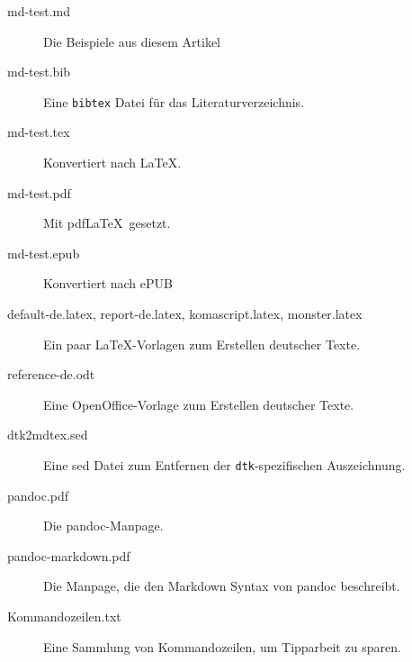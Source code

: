 \documentclass[11pt,ngerman,a4paper]{article}
\begin{document}
\begin{description}
\item[md-test.md]
Die Beispiele aus diesem Artikel
\item[md-test.bib]
Eine \texttt{bibtex} Datei für das Literaturverzeichnis.
\item[md-test.tex]
Konvertiert nach LaTeX.
\item[md-test.pdf]
Mit pdfLaTeX~gesetzt.
\item[md-test.epub]
Konvertiert nach ePUB
\item[default-de.latex, report-de.latex, komascript.latex,
monster.latex]
Ein paar LaTeX-Vorlagen zum Erstellen deutscher Texte.
\item[reference-de.odt]
Eine OpenOffice-Vorlage zum Erstellen deutscher Texte.
\item[dtk2mdtex.sed]
Eine sed Datei zum Entfernen der \texttt{dtk}-spezifischen Auszeichnung.
\item[pandoc.pdf]
Die pandoc-Manpage.
\item[pandoc-markdown.pdf]
Die Manpage, die den Markdown Syntax von pandoc beschreibt.
\item[Kommandozeilen.txt]
Eine Sammlung von Kommandozeilen, um Tipparbeit zu sparen.
\end{description}

\printbibliography
\end{document}
